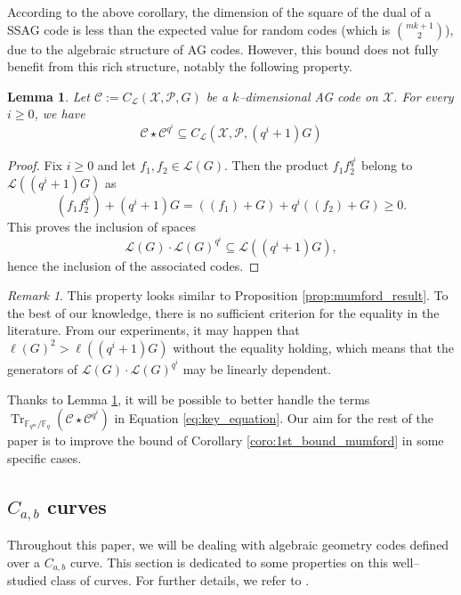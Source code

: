 \documentclass[a4paper]{amsart}
\newtheorem{lemma}[thm]{Lemma}
\theoremstyle{definition}
\theoremstyle{remark}
\newtheorem{remark}[thm]{Remark}
\newcommand{\calL}{\mathcal{L}}
\newcommand{\calC}{\mathcal{C}}
\newcommand{\calX}{\mathcal{X}}
\newcommand{\fq}{\mathbb{F}_{q}}
\newcommand{\Tr}[1]{\operatorname{Tr}_{\mathbb{F}_{q^m}/\fq}\left(#1\right)}
\begin{document}
According to the above corollary, the dimension of the square of the dual of a SSAG code is less than the expected value for random codes (which is $\binom{mk+1}{2}$), due to the algebraic structure of AG codes. However, this bound does not fully benefit from this rich structure, notably the following property.

\begin{lemma}\label{lem:Schur-Product-Power}
	 Let $\mathcal{C} := C_{\calL}(\calX,\mathcal{P},G)$ be a $k$--dimensional AG code on $\calX$. For every $i \geq 0$, we have
	 \[\calC \star \calC^{q^i} \subseteq C_{\calL}(\calX,\mathcal{P},(q^i+1)G)\]
\end{lemma}

\begin{proof}
	Fix $i \geq 0$ and let $f_1,f_2 \in \calL(G)$. Then the product $f_1f_2^{q^i}$ belong to $\calL((q^i+1)G)$ as
	$$(f_1f_2^{q^i}) + (q^i+1)G = \left((f_1) + G\right) + q^i\left((f_2) + G\right) \geq 0.$$
	This proves the inclusion of spaces
	$$ \calL(G)\cdot \calL(G)^{q^i} \subseteq \calL((q^i+1)G),$$
	hence the inclusion of the associated codes.
\end{proof}

\begin{remark}
This property looks similar to Proposition \ref{prop:mumford_result}. To the best of our knowledge, there is no sufficient criterion for the equality in the literature. From our experiments, it may happen that $\ell(G)^2 > \ell((q^i+1)G)$ without the equality holding, which means that the generators of $\calL(G)\cdot \calL(G)^{q^i}$ may be linearly dependent. 
\end{remark}

Thanks to Lemma \ref{lem:Schur-Product-Power}, it will be possible to better handle the terms $\Tr{\calC\star \calC^{q^i}}$ in Equation \eqref{eq:key_equation}. Our aim for the rest of the paper is to improve the bound of Corollary \ref {coro:1st_bound_mumford} in some specific cases.

\subsection{$C_{a,b}$ curves} \label{section:C_a,b_codes}
Throughout this paper, we will be dealing with algebraic geometry codes defined over a $C_{a,b}$ curve. This section is dedicated to some properties on this well--studied class of curves. For further details, we refer to \cite{Miu93}. 
\end{document}
